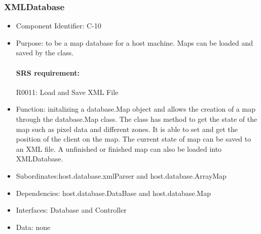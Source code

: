 \documentclass[11pt, a4paper]{report}
\begin{document}
\subsubsection{XMLDatabase}
\begin{itemize}
\item Component Identifier: C-10
\item Purpose: to be a map database for a host machine. Maps can be loaded and saved by the 
class. 
\paragraph{SRS requirement:} R0011: Load and Save XML File
\item Function: initalizing a  database.Map object and allows the creation of a map through
the database.Map class. The class has method to get the state of the map such as pixel data and
different zones. It is able to set and get the position of the client on the map. The current state
of map can be saved to an XML file. A unfinished or finished map can also be loaded into XMLDatabase. 
\item Subordinates:host.database.xmlParser and host.database.ArrayMap
\item Dependencies: host.database.DataBase and host.database.Map
\item Interfaces: Database and Controller
\item Data: none
\end{itemize}

\end{document}

